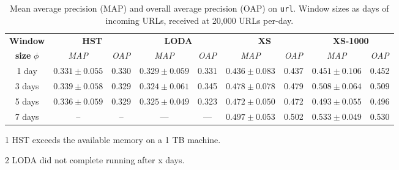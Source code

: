 \documentclass[11pt,onecolumn]{article}
\begin{document}
\begin{table}[!hbtp]
    \centering
    \begin{threeparttable}
    \begin{tabular}{ccccccccc}
    \toprule
    \textbf{Window} & \multicolumn{2}{c}{\textbf{HST}} & \multicolumn{2}{c}{\textbf{LODA}} & \multicolumn{2}{c}{\textbf{XS}} & \multicolumn{2}{c}{\textbf{XS-1000}} \\
    \textbf{size} $\phi$ & \textit{MAP} & \textit{OAP} & \textit{MAP}& \textit{OAP}     & \textit{MAP} & \textit{OAP} & \textit{MAP} & \textit{OAP}	\\
    \midrule
    1 day  & $0.331 \pm 0.055$  & 0.330  & $0.329 \pm 0.059$ & 0.331 & $0.436 \pm 0.083$ & 0.437 & $0.451 \pm 0.106$ & 0.452 \\
    3 days & $0.339 \pm 0.058$  & 0.329  & $0.324 \pm 0.061$ & 0.345   & $0.478 \pm 0.078$ & 0.479 & $0.508 \pm 0.064$ & 0.509\\
    5 days & $0.336 \pm 0.059$  & 0.329  & $0.325 \pm 0.049$ & 0.323   & $0.472 \pm 0.050$ & 0.472 & $0.493 \pm 0.055$ & 0.496 \\
    7 days\tnote{1,2} & --                  & --      & ---        & ---          & $0.497 \pm 0.053$ & 0.502 & $0.533 \pm 0.049$ & 0.530 \\
    \bottomrule
    \end{tabular}
    \caption{Mean average precision (MAP) and overall average precision (OAP) on \texttt{url}. Window sizes as days of incoming URLs, received at 20,000 URLs per-day.}
    \begin{tablenotes}
    \item[1] HST exceeds the available memory on a 1 TB machine.
    \item[2] LODA did not complete running after x days.
    \end{tablenotes}
    \end{threeparttable}
\end{table}

\printbibliography
\end{document}
